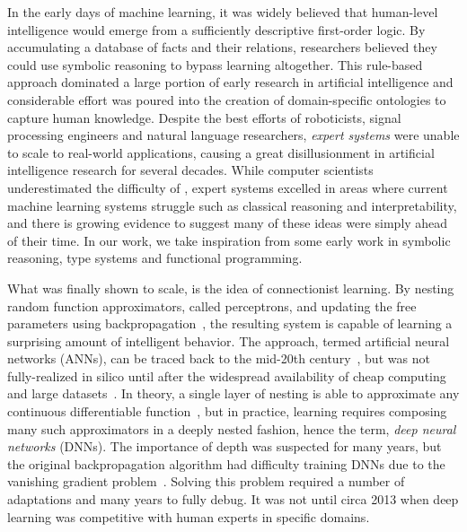 \documentclass[12pt,initial,twoside,maitrise]{dms}
\numberwithin{equation}{section}
\numberwithin{table}{chapter}
\numberwithin{figure}{chapter}
\begin{document}
In the early days of machine learning, it was widely believed that human-level intelligence would emerge from a sufficiently descriptive first-order logic. By accumulating a database of facts and their relations, researchers believed they could use symbolic reasoning to bypass learning altogether. This rule-based approach dominated a large portion of early research in artificial intelligence and considerable effort was poured into the creation of domain-specific ontologies to capture human knowledge. Despite the best efforts of roboticists, signal processing engineers and natural language researchers, \textit{expert systems} were unable to scale to real-world applications, causing a great disillusionment in artificial intelligence research for several decades. While computer scientists underestimated the difficulty of , expert systems excelled in areas where current machine learning systems struggle such as classical reasoning and interpretability, and there is growing evidence to suggest many of these ideas were simply ahead of their time. In our work, we take inspiration from some early work in symbolic reasoning, type systems and functional programming.

What was finally shown to scale, is the idea of connectionist learning. By nesting random function approximators, called perceptrons, and updating the free parameters using backpropagation~\citep{werbos1990backpropagation, rumelhart1988learning}, the resulting system is capable of learning a surprising amount of intelligent behavior. The approach, termed artificial neural networks (ANNs), can be traced back to the mid-20th century~\citep{ivakhnenko1965cybernetic, rosenblatt1958perceptron}, but was not fully-realized in silico until after the widespread availability of cheap computing and large datasets~\citep{lecun2015deep}. In theory, a single layer of nesting is able to approximate any continuous differentiable function~\citep{hornik1989multilayer}, but in practice, learning requires composing many such approximators in a deeply nested fashion, hence the term, \textit{deep neural networks} (DNNs). The importance of depth was suspected for many years, but the original backpropagation algorithm had difficulty training DNNs due to the vanishing gradient problem~\citep{bengio1994learning}. Solving this problem required a number of adaptations and many years to fully debug. It was not until circa 2013 when deep learning was competitive with human experts in specific domains.
\end{document}
